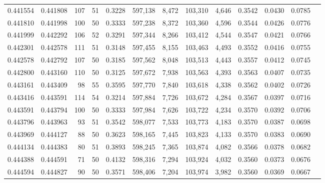 \begin{tabular}{rrrrrrrrrrrrr}
0.441554 & 0.441808 &   107 &  51 &                                     0.3228 & 597,138 &   8,472 & 103,310 &   4,646 & 0.3542 & 0.0430 & 0.0785 \\
0.441810 & 0.441998 &   100 &  50 &                                     0.3333 & 597,238 &   8,372 & 103,360 &   4,596 & 0.3544 & 0.0426 & 0.0776 \\
0.441999 & 0.442292 &   106 &  52 &                                     0.3291 & 597,344 &   8,266 & 103,412 &   4,544 & 0.3547 & 0.0421 & 0.0766 \\
0.442301 & 0.442578 &   111 &  51 &                                     0.3148 & 597,455 &   8,155 & 103,463 &   4,493 & 0.3552 & 0.0416 & 0.0755 \\
0.442578 & 0.442792 &   107 &  50 &                                     0.3185 & 597,562 &   8,048 & 103,513 &   4,443 & 0.3557 & 0.0412 & 0.0745 \\
0.442800 & 0.443160 &   110 &  50 &                                     0.3125 & 597,672 &   7,938 & 103,563 &   4,393 & 0.3563 & 0.0407 & 0.0735 \\
0.443161 & 0.443409 &    98 &  55 &                                     0.3595 & 597,770 &   7,840 & 103,618 &   4,338 & 0.3562 & 0.0402 & 0.0726 \\
0.443416 & 0.443591 &   114 &  54 &                                     0.3214 & 597,884 &   7,726 & 103,672 &   4,284 & 0.3567 & 0.0397 & 0.0716 \\
0.443591 & 0.443794 &   100 &  50 &                                     0.3333 & 597,984 &   7,626 & 103,722 &   4,234 & 0.3570 & 0.0392 & 0.0706 \\
0.443796 & 0.443963 &    93 &  51 &                                     0.3542 & 598,077 &   7,533 & 103,773 &   4,183 & 0.3570 & 0.0387 & 0.0698 \\
0.443969 & 0.444127 &    88 &  50 &                                     0.3623 & 598,165 &   7,445 & 103,823 &   4,133 & 0.3570 & 0.0383 & 0.0690 \\
0.444134 & 0.444383 &    80 &  51 &                                     0.3893 & 598,245 &   7,365 & 103,874 &   4,082 & 0.3566 & 0.0378 & 0.0682 \\
0.444388 & 0.444591 &    71 &  50 &                                     0.4132 & 598,316 &   7,294 & 103,924 &   4,032 & 0.3560 & 0.0373 & 0.0676 \\
0.444594 & 0.444827 &    90 &  50 &                                     0.3571 & 598,406 &   7,204 & 103,974 &   3,982 & 0.3560 & 0.0369 & 0.0667 \\

\end{tabular}
